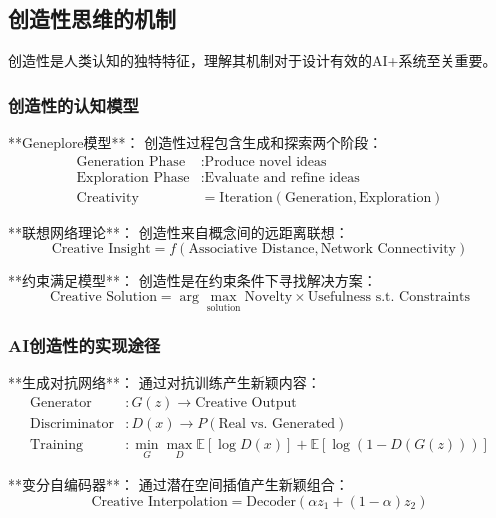 \subsection{创造性思维的机制}

创造性是人类认知的独特特征，理解其机制对于设计有效的AI+系统至关重要。

\subsubsection{创造性的认知模型} %

**Geneplore模型**：
创造性过程包含生成和探索两个阶段：
\begin{align}
\text{Generation Phase} &: \text{Produce novel ideas} \\
\text{Exploration Phase} &: \text{Evaluate and refine ideas} \\
\text{Creativity} &= \text{Iteration}(\text{Generation}, \text{Exploration})
\end{align}

**联想网络理论**：
创造性来自概念间的远距离联想：
\begin{equation}
\text{Creative Insight} = f(\text{Associative Distance}, \text{Network Connectivity})
\end{equation}

**约束满足模型**：
创造性是在约束条件下寻找解决方案：
\begin{equation}
\text{Creative Solution} = \arg\max_{\text{solution}} \text{Novelty} \times \text{Usefulness} \text{ s.t. } \text{Constraints}
\end{equation}

\subsubsection{AI创造性的实现途径} %

**生成对抗网络**：
通过对抗训练产生新颖内容：
\begin{align}
\text{Generator} &: G(z) \rightarrow \text{Creative Output} \\
\text{Discriminator} &: D(x) \rightarrow P(\text{Real vs. Generated}) \\
\text{Training} &: \min_G \max_D \mathbb{E}[\log D(x)] + \mathbb{E}[\log(1-D(G(z)))]
\end{align}

**变分自编码器**：
通过潜在空间插值产生新颖组合：
\begin{equation}
\text{Creative Interpolation} = \text{Decoder}(\alpha z_1 + (1-\alpha) z_2)
\end{equation}

